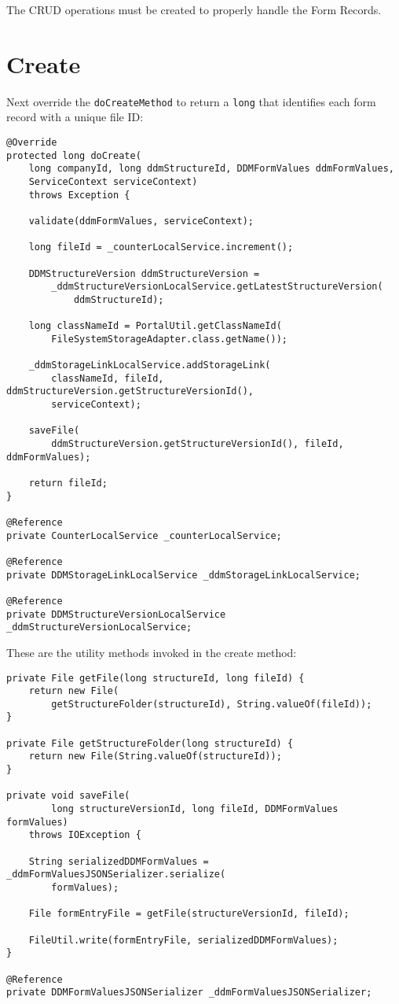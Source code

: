 The CRUD operations must be created to properly handle the Form Records.

\section{Create}\label{create}

Next override the \texttt{doCreateMethod} to return a \texttt{long} that
identifies each form record with a unique file ID:

\begin{verbatim}
@Override
protected long doCreate(
    long companyId, long ddmStructureId, DDMFormValues ddmFormValues, 
    ServiceContext serviceContext)
    throws Exception {

    validate(ddmFormValues, serviceContext);

    long fileId = _counterLocalService.increment();

    DDMStructureVersion ddmStructureVersion =
        _ddmStructureVersionLocalService.getLatestStructureVersion(
            ddmStructureId);

    long classNameId = PortalUtil.getClassNameId(
        FileSystemStorageAdapter.class.getName());

    _ddmStorageLinkLocalService.addStorageLink(
        classNameId, fileId, ddmStructureVersion.getStructureVersionId(),
        serviceContext);

    saveFile(
        ddmStructureVersion.getStructureVersionId(), fileId, ddmFormValues);

    return fileId;
}

@Reference
private CounterLocalService _counterLocalService;

@Reference
private DDMStorageLinkLocalService _ddmStorageLinkLocalService;

@Reference
private DDMStructureVersionLocalService _ddmStructureVersionLocalService;
\end{verbatim}

These are the utility methods invoked in the create method:

\begin{verbatim}
private File getFile(long structureId, long fileId) {
    return new File(
        getStructureFolder(structureId), String.valueOf(fileId));
}

private File getStructureFolder(long structureId) {
    return new File(String.valueOf(structureId));
}

private void saveFile(
        long structureVersionId, long fileId, DDMFormValues formValues)
    throws IOException {

    String serializedDDMFormValues = _ddmFormValuesJSONSerializer.serialize(
        formValues);

    File formEntryFile = getFile(structureVersionId, fileId);

    FileUtil.write(formEntryFile, serializedDDMFormValues);
}

@Reference
private DDMFormValuesJSONSerializer _ddmFormValuesJSONSerializer;
\end{verbatim}

